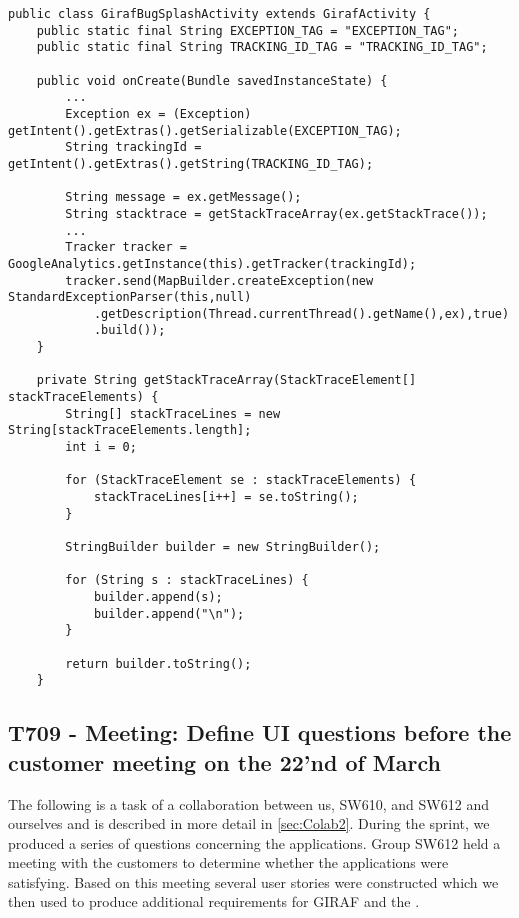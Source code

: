 \begin{minipage}[H]{\linewidth}
\begin{lstlisting}[caption = Our approach to outputting the stack trace, label = BugOurSol]
public class GirafBugSplashActivity extends GirafActivity {
	public static final String EXCEPTION_TAG = "EXCEPTION_TAG";
    public static final String TRACKING_ID_TAG = "TRACKING_ID_TAG";
    
	public void onCreate(Bundle savedInstanceState) {
		...
		Exception ex = (Exception) getIntent().getExtras().getSerializable(EXCEPTION_TAG); 
		String trackingId = getIntent().getExtras().getString(TRACKING_ID_TAG);
		
		String message = ex.getMessage();
        String stacktrace = getStackTraceArray(ex.getStackTrace());
        ...
        Tracker tracker = GoogleAnalytics.getInstance(this).getTracker(trackingId);
        tracker.send(MapBuilder.createException(new StandardExceptionParser(this,null)
            .getDescription(Thread.currentThread().getName(),ex),true)
            .build());
    }

	private String getStackTraceArray(StackTraceElement[] stackTraceElements) {
        String[] stackTraceLines = new String[stackTraceElements.length];
        int i = 0;
        
        for (StackTraceElement se : stackTraceElements) {
            stackTraceLines[i++] = se.toString();
        }
        
        StringBuilder builder = new StringBuilder();
        
        for (String s : stackTraceLines) {
            builder.append(s);
            builder.append("\n");
        }
        
        return builder.toString();
    }
\end{lstlisting}
\end{minipage}

\subsection{T709 - Meeting: Define UI questions before the customer meeting on the
22'nd of March}
The following is a task of a collaboration between us, SW610, and SW612 and
ourselves and is described in more detail in \autoref{sec:Colab2}. During the sprint, we
produced a series of questions concerning the applications. Group SW612
held a meeting with the customers to determine whether the applications were
satisfying. Based on this meeting several user stories were constructed which
we then used to produce additional requirements for GIRAF and the \lapp.

